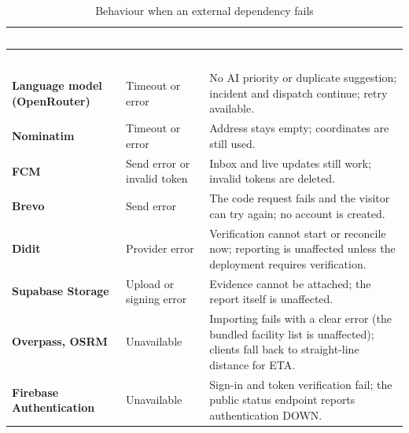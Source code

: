 {\tabfont\rowband
\begin{longtable}{@{}>{\raggedright\arraybackslash}p{}>{\raggedright\arraybackslash}p{}>{\raggedright\arraybackslash}p{}@{}}
\caption{Behaviour when an external dependency fails}\label{tab:failure}\\
\rowcolor{najdanavy}\textcolor{white}{\sffamily\bfseries\small Dependency} & \textcolor{white}{\sffamily\bfseries\small If it fails} & \textcolor{white}{\sffamily\bfseries\small Effect}\\
\endfirsthead
\rowcolor{najdanavy}\textcolor{white}{\sffamily\bfseries\small Dependency} & \textcolor{white}{\sffamily\bfseries\small If it fails} & \textcolor{white}{\sffamily\bfseries\small Effect}\\
\endhead
\bottomrule\endlastfoot
\textbf{Language model (OpenRouter)} & Timeout or error & No AI priority or duplicate suggestion; incident and dispatch continue; retry available.\\
\textbf{Nominatim} & Timeout or error & Address stays empty; coordinates are still used.\\
\textbf{FCM} & Send error or invalid token & Inbox and live updates still work; invalid tokens are deleted.\\
\textbf{Brevo} & Send error & The code request fails and the visitor can try again; no account is created.\\
\textbf{Didit} & Provider error & Verification cannot start or reconcile now; reporting is unaffected unless the deployment requires verification.\\
\textbf{Supabase Storage} & Upload or signing error & Evidence cannot be attached; the report itself is unaffected.\\
\textbf{Overpass, OSRM} & Unavailable & Importing fails with a clear error (the bundled facility list is unaffected); clients fall back to straight-line distance for ETA.\\
\textbf{Firebase Authentication} & Unavailable & Sign-in and token verification fail; the public status endpoint reports authentication DOWN.\\
\end{longtable}}
